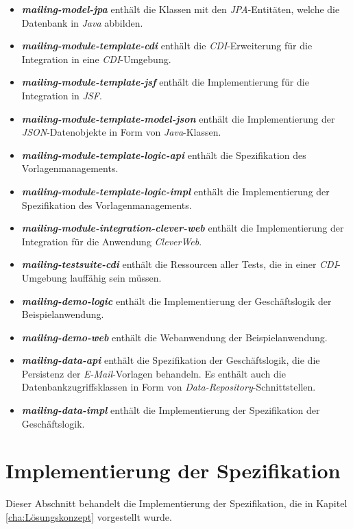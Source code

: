 \begin{itemize}
	\item\emph{\textbf{mailing-model-jpa}} enthält die Klassen mit den \emph{JPA}-Entitäten, welche die Datenbank in \emph{Java} abbilden.
	\item\emph{\textbf{mailing-module-template-cdi}} enthält die \emph{CDI}-Erweiterung für die Integration in eine \emph{CDI}-Umgebung.
	\item\emph{\textbf{mailing-module-template-jsf}} enthält die Implementierung für die Integration in \emph{JSF}.
	\item\emph{\textbf{mailing-module-template-model-json}} enthält die Implementierung der \emph{JSON}-Datenobjekte in Form von \emph{Java}-Klassen.	
	\item\emph{\textbf{mailing-module-template-logic-api}} enthält die Spezifikation des Vorlagenmanagements.
	\item\emph{\textbf{mailing-module-template-logic-impl}} enthält die Implementierung der Spezifikation des Vorlagenmanagements.
	\item\emph{\textbf{mailing-module-integration-clever-web}} enthält die Implementierung der Integration für die Anwendung \emph{CleverWeb}.
	\item\emph{\textbf{mailing-testsuite-cdi}} enthält die Ressourcen aller Tests, die in einer \emph{CDI}-Umgebung lauffähig sein müssen.
	\item\emph{\textbf{mailing-demo-logic}} enthält die Implementierung der Geschäftslogik der Beispielanwendung.
	\item\emph{\textbf{mailing-demo-web}} enthält die Webanwendung der Beispielanwendung.
	\item\emph{\textbf{mailing-data-api}} enthält die Spezifikation der Geschäftslogik, die die Persistenz der \emph{E-Mail}-Vorlagen behandeln. Es enthält auch die Datenbankzugriffsklassen in Form von \emph{Data-Repository}-Schnittstellen.
	\item\emph{\textbf{mailing-data-impl}} enthält die Implementierung der Spezifikation der Geschäftslogik.
\end{itemize} 

\section{Implementierung der Spezifikation}
Dieser Abschnitt behandelt die Implementierung der Spezifikation, die in Kapitel \ref{cha:Lösungskonzept} vorgestellt wurde. 

